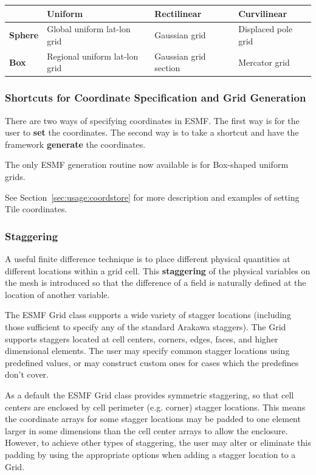 \medskip
\begin{tabular}{|p{.9in}|p{1.7in}|p{1.7in}|p{1.7in}|}
\hline
 & {\bf Uniform} & {\bf Rectilinear} & {\bf Curvilinear} \\ 
\hline
{\bf Sphere} & Global uniform lat-lon grid & Gaussian grid & Displaced pole grid \\
\hline
{\bf Box} & Regional uniform lat-lon grid & Gaussian grid section & Mercator grid \\
\hline
\end{tabular}

\subsubsection{Shortcuts for Coordinate Specification and Grid Generation}

There are two ways of specifying coordinates in ESMF.  The
first way is for the user to {\bf set} the coordinates.  The second 
way is to take a shortcut and have the framework {\bf generate}
the coordinates.  

The only ESMF generation routine now available is for Box-shaped
uniform grids.

See Section~\ref{sec:usage:coordstore} for more description and examples of
setting Tile coordinates.

\subsubsection{Staggering}

 A useful finite difference technique is to place different physical
quantities at different locations within a grid cell. This {\bf staggering}
of the physical variables on the mesh is introduced so that the difference
of a field is naturally defined at the location of another variable. 

The ESMF Grid class supports a wide variety of stagger locations (including
those sufficient to specify any of the standard Arakawa staggers). The 
Grid supports staggers located at cell centers, corners, edges, 
faces, and higher dimensional elements. The user may specify
common stagger locations using predefined values, or may construct
custom ones for cases which the predefines don't cover.

As a default the ESMF Grid class provides symmetric staggering, so
that cell centers are enclosed by cell perimeter (e.g. corner) 
stagger locations. This means the coordinate arrays for
some stagger locations may be padded to one element larger in some
dimensions than the cell center arrays to allow the enclosure. 
However, to achieve other types of staggering, the user may alter 
or eliminate this padding by using the appropriate options when adding
a stagger location to a Grid. 
 
